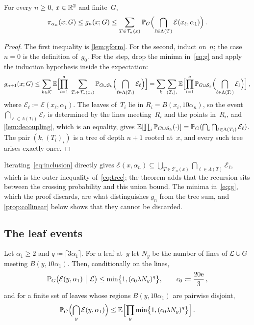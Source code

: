 \documentclass[11pt,letterpaper]{article}
\newcommand{\cS}{\mathcal S}
\renewcommand{\cE}{\mathcal E}
\begin{document}
\begin{theorem}
\label{thm:tree}
For every $n\ge0$, $x\in\mathbb R^2$ and finite~$G$,
\begin{equation}
\label{eq:tree}
  \pi_{\alpha_n}(x;G)\le g_n(x;G)\le\sum_{T\in\mathcal T_n(x)}\P_G\Bigl(\bigcap_{\ell\in\Lambda(T)}\cE(x_\ell,\alpha_1)\Bigr)\,.
\end{equation}
\end{theorem}

\begin{proof}
The first inequality is \cref{lem:gform}. For the second, induct on~$n$; the case $n=0$ is the definition of~$g_0$. For the step, drop the minima in~\eqref{eq:g} and apply the induction hypothesis inside the expectation:
\begin{equation*}
  g_{n+1}(x;G)\le\sum_{k\in\mathcal K}\E\Bigl[\prod_{i=1}^a\ \sum_{T_i\in\mathcal T_n(x_i)}\P_{G\cup\cS_k}\Bigl(\bigcap_{\ell\in\Lambda(T_i)}\cE_\ell\Bigr)\Bigr]=\sum_{k}\sum_{(T_i)_i}\E\Bigl[\prod_{i=1}^a\P_{G\cup\cS_k}\Bigl(\bigcap_{\ell\in\Lambda(T_i)}\cE_\ell\Bigr)\Bigr]\,,
\end{equation*}
where $\cE_\ell\coloneqq\cE(x_\ell,\alpha_1)$. The leaves of~$T_i$ lie in $R_i=B(x_i,10\alpha_n)$, so the event $\bigcap_{\ell\in\Lambda(T_i)}\cE_\ell$ is determined by the lines meeting~$R_i$ and the points in~$R_i$, and \cref{lem:decoupling}, which is an equality, gives $\E[\prod_i\P_{G\cup\cS_k}(\cdot)]=\P_G(\bigcap_i\bigcap_{\ell\in\Lambda(T_i)}\cE_\ell)$. The pair $(k,(T_i)_i)$ is a tree of depth $n+1$ rooted at~$x$, and every such tree arises exactly once.
\end{proof}

Iterating~\eqref{eq:inclusion} directly gives $\cE(x,\alpha_n)\subseteq\bigcup_{T\in\mathcal T_n(x)}\bigcap_{\ell\in\Lambda(T)}\cE_\ell$, which is the outer inequality of~\eqref{eq:tree}; the theorem adds that the recursion sits between the crossing probability and this union bound. The minima in~\eqref{eq:g}, which the proof discards, are what distinguishes $g_n$ from the tree sum, and \cref{prop:collinear} below shows that they cannot be discarded.

\subsection{The leaf events}

\begin{lemma}
\label{lem:leaf}
Let $\alpha_1\ge2$ and $q\coloneqq\lceil3\alpha_1\rceil$. For a leaf at~$y$ let $N_y$ be the number of lines of $\mathcal L\cup G$ meeting $B(y,10\alpha_1)$. Then, conditionally on the lines,
\begin{equation}
\label{eq:leaf}
  \P_G\bigl(\cE(y,\alpha_1)\ \big\vert\ \cL\bigr)\le\min\bigl\{1,(c_0\lambda N_y)^{q}\bigr\},\qquad c_0\coloneqq\frac{20\e}{3}\,,
\end{equation}
and for a finite set of leaves whose regions $B(y,10\alpha_1)$ are pairwise disjoint,
\begin{equation}
\label{eq:leaves}
  \P_G\Bigl(\bigcap_y\cE(y,\alpha_1)\Bigr)\le\E\Bigl[\prod_y\min\bigl\{1,(c_0\lambda N_y)^{q}\bigr\}\Bigr]\,.
\end{equation}
\end{lemma}
\end{document}
